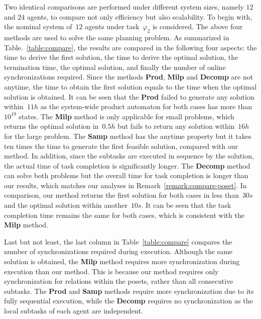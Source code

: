 Two identical comparisons are performed under different system sizes,
namely $12$ and $24$ agents, to compare not only efficiency but also scalability.
To begin with, the nominal system of~$12$ agents under task~$\varphi_2$ is considered.
The above four methods are used to solve the same planning problem.
As summarized in Table.~\ref{table:compare},
the results are compared in the following four aspects:
the time to derive the first solution,
the time to derive the optimal solution,
the termination time, the optimal solution,
and finally the number of online synchronizations required.
Since the methods \textbf{Prod}, \textbf{Milp} and \textbf{Decomp} are not
anytime, the time to obtain  the first solution equals to the time
when the optimal solution is obtained.
It can be seen that the \textbf{Prod} failed to generate any solution
within~$11h$ as the system-wide product automaton for both cases
has more than $10^{19}$ states.
The \textbf{Milp} method is only applicable for small problems,
which returns the optimal solution in~$0.5h$ but fails to
return any solution within~$16h$ for the large problem.
The \textbf{Samp} method has the anytime property but it takes ten times
the time to generate
the first feasible solution, compared with our method.
In addition, since the subtasks are executed in sequence by the solution,
the actual time of task completion is significantly longer.
The \textbf{Decomp} method can solve both problems but the overall time
for task completion is longer than our results,
which matches our analyses in Remark~\ref{remark:compare-poset}.
In comparison, our method returns the first solution for both cases in less
than~$30s$ and the optimal solution within another~$10s$.
It can be seen that the task completion time remains the same for both cases,
which is consistent with the \textbf{Milp} method.

Last but not least, the last column in Table~\ref{table:compare} compares the number
of synchronizations required during execution.
Although the same solution is obtained, the \textbf{Milp} method requires more
synchronization during execution than our method.
This is because our method requires only synchronization for relations within the
posets, rather than all consecutive subtasks.
The \textbf{Prod} and \textbf{Samp} methods require more synchronization due to
its fully sequential execution,
while the \textbf{Decomp} requires no synchronization as
the local subtasks of each agent are independent.
